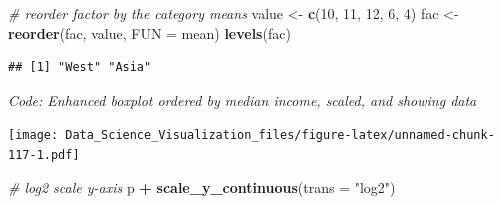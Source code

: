 \documentclass[
]{article}
\newenvironment{Shaded}{\begin{snugshade}}{\end{snugshade}}
\newcommand{\CommentTok}[1]{\textcolor[rgb]{0.56,0.35,0.01}{\textit{#1}}}
\newcommand{\DataTypeTok}[1]{\textcolor[rgb]{0.13,0.29,0.53}{#1}}
\newcommand{\DecValTok}[1]{\textcolor[rgb]{0.00,0.00,0.81}{#1}}
\newcommand{\KeywordTok}[1]{\textcolor[rgb]{0.13,0.29,0.53}{\textbf{#1}}}
\newcommand{\NormalTok}[1]{#1}
\newcommand{\OperatorTok}[1]{\textcolor[rgb]{0.81,0.36,0.00}{\textbf{#1}}}
\newcommand{\StringTok}[1]{\textcolor[rgb]{0.31,0.60,0.02}{#1}}
\begin{document}
\begin{Shaded}
\begin{Highlighting}[]
\CommentTok{# reorder factor by the category means}
\NormalTok{value <-}\StringTok{ }\KeywordTok{c}\NormalTok{(}\DecValTok{10}\NormalTok{, }\DecValTok{11}\NormalTok{, }\DecValTok{12}\NormalTok{, }\DecValTok{6}\NormalTok{, }\DecValTok{4}\NormalTok{)}
\NormalTok{fac <-}\StringTok{ }\KeywordTok{reorder}\NormalTok{(fac, value, }\DataTypeTok{FUN =}\NormalTok{ mean)}
\KeywordTok{levels}\NormalTok{(fac)}
\end{Highlighting}
\end{Shaded}

\begin{verbatim}
## [1] "West" "Asia"
\end{verbatim}

\emph{Code: Enhanced boxplot ordered by median income, scaled, and
showing data}

\begin{Shaded}
\end{Shaded}

\texttt{[image: Data\_Science\_Visualization\_files/figure-latex/unnamed-chunk-117-1.pdf]}

\begin{Shaded}
\begin{Highlighting}[]
\CommentTok{# log2 scale y-axis}
\NormalTok{p }\OperatorTok{+}\StringTok{ }\KeywordTok{scale_y_continuous}\NormalTok{(}\DataTypeTok{trans =} \StringTok{"log2"}\NormalTok{)}
\end{Highlighting}
\end{Shaded}
\end{document}
